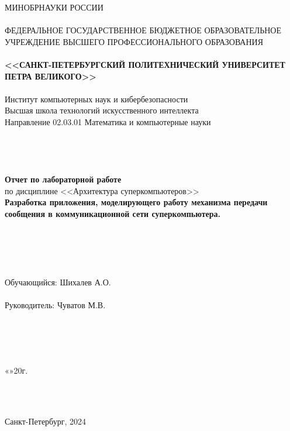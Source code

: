 \documentclass[11pt,a4paper,final]{article} %
\begin{document}
\thispagestyle{empty}

\begin{center}
	{\Large МИНОБРНАУКИ РОССИИ}\\
	~\\
	{\large ФЕДЕРАЛЬНОЕ ГОСУДАРСТВЕННОЕ БЮДЖЕТНОЕ ОБРАЗОВАТЕЛЬНОЕ УЧРЕЖДЕНИЕ ВЫСШЕГО ПРОФЕССИОНАЛЬНОГО ОБРАЗОВАНИЯ}\\
	~\\
	{\Large \bf <<САНКТ-ПЕТЕРБУРГСКИЙ ПОЛИТЕХНИЧЕСКИЙ УНИВЕРСИТЕТ ПЕТРА ВЕЛИКОГО>>}\\
	~\\
	{\large Институт компьютерных наук и кибербезопасности }\\
	{\large Высшая школа технологий искусственного интеллекта}\\
	{\large Направление 02.03.01 Математика и компьютерные науки}\\
	~\\
	~\\
	~\\
	~\\
	{\Large \bf  Отчет по лабораторной работе }\\
	\vspace{3mm}
	{\Large {по дисциплине <<Архитектура суперкомпьютеров>>}}\\
	\vspace{3mm}
	{\Large \bf Разработка приложения, моделирующего работу механизма передачи сообщения в коммуникационной сети суперкомпьютера. }\\
	~\\
	~\\
	~\\
	~\\
	~\\
	{\large Обучающийся: \underline{\hspace{3.5cm}} \hspace{12mm} Шихалев А.О.}\\
	~\\
	{\large Руководитель: \underline{\hspace{3.5cm}} \hspace{12mm} Чуватов М.В.}\\
	~\\
	~\\
	~\\
	~\\
\end{center}
\begin{flushright}
	
	«\underline{\hspace{1cm}}»\underline{\hspace{3cm}}20\underline{\hspace{0.7cm}}г.
\end{flushright}
~\\
~\\
\begin{center}
	{\large Санкт-Петербург, 2024}
\end{center}
\end{document}
